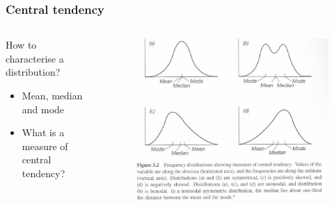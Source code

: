\documentclass[10pt, compress]{beamer}
\begin{document}
\begin{frame}
    \frametitle{Central tendency}
    \begin{columns}
        \begin{block}{How to characterise a distribution?}
            \begin{itemize}
                \item Mean, median and mode
                \item \alert{What is a measure of central tendency?}
            \end{itemize}
        \end{block}
        \begin{block}{}
            \begin{figure}
                \begin{center}
                    \includegraphics[scale=0.5]{img/central_tendancy.jpg}
                \end{center}
            \end{figure}
        \end{block}
    \end{columns}
\end{frame}
\end{document}
